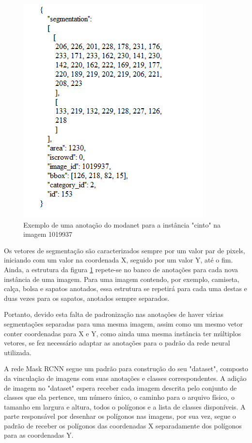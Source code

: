 \documentclass[12pt]{report}
\begin{document}
\begin{figure}[width=\textwidth]
    \centering
    \includegraphics[scale=0.8]{images/json-modanet.png}
    \caption{Exemplo de uma anotação do modanet para a instância "cinto" na imagem 1019937}
    \label{fig:json-modanet}
\end{figure}

Os vetores de segmentação são caracterizados sempre por um valor par de pixels, iniciando com um valor na coordenada X, seguido por um valor Y, até o fim. Ainda, a estrutura da figura \ref{fig:json-modanet} repete-se no banco de anotações para cada nova instância de uma imagem. Para uma imagem contendo, por exemplo, camiseta, calça, bolsa e sapatos anotados, essa estrutura se repetirá para cada uma destas e duas vezes para os sapatos, anotados sempre separados. 

Portanto, devido esta falta de padronização nas anotações de haver várias segmentações separadas para uma mesma imagem, assim como um mesmo vetor conter coordenadas para X e Y, como ainda uma mesma instância ter múltiplos vetores, se fez necessário adaptar as anotações para o padrão da rede neural utilizada. 

A rede Mask RCNN segue um padrão para construção do seu "dataset", composto da vinculação de imagens com suas anotações e classes correspondentes. A adição de imagem no "dataset" espera receber cada imagem descrita pelo conjunto de classes que ela pertence, um número único, o caminho para o arquivo físico, o tamanho em largura e altura, todos o polígonos e a lista de classes disponíveis. A parte responsável por desenhar os polígonos nas imagens, por sua vez, segue o padrão de receber os polígonos das coordenadas X separadamente dos polígonos para as coordenadas Y. 
\end{document}
